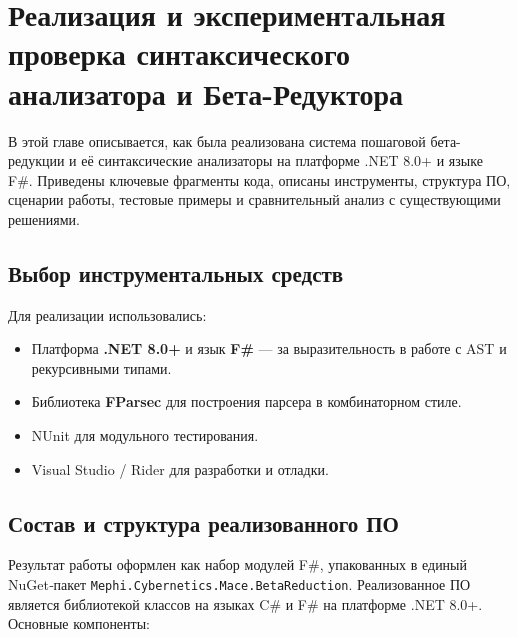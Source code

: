 \chapter{Реализация и экспериментальная проверка синтаксического анализатора и Бета-Редуктора}
\label{chapter4}

В этой главе описывается, как была реализована система пошаговой бета-редукции и её синтаксические анализаторы на платформе .NET 8.0+ и языке F\#. Приведены ключевые фрагменты кода, описаны инструменты, структура ПО, сценарии работы, тестовые примеры и сравнительный анализ с существующими решениями.

\section{Выбор инструментальных средств}
Для реализации использовались:
\begin{itemize}
  \item Платформа \textbf{.NET 8.0+} и язык \textbf{F\#} — за выразительность в работе с AST и рекурсивными типами.
  \item Библиотека \textbf{FParsec} для построения парсера в комбинаторном стиле.
  \item NUnit для модульного тестирования.
  \item Visual Studio / Rider для разработки и отладки.
\end{itemize}

\section{Состав и структура реализованного ПО}
\label{sec:software-structure}

Результат работы оформлен как набор модулей F\#, упакованных в единый NuGet‑пакет \texttt{Mephi.Cybernetics.Mace.BetaReduction}. Реализованное ПО является библиотекой классов на языках C\# и F\# на платформе .NET 8.0+. Основные компоненты:

